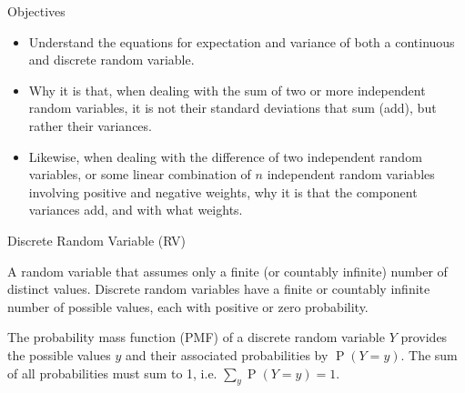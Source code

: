 \documentclass[10pt,handout]{beamer}\usepackage[]{graphicx}\usepackage[]{color}
\newcommand{\Prob}{\operatorname{P}}
\begin{document}
\begin{frame}{Objectives}

	\begin{itemize}
			  \setlength{\itemsep}{10pt}		
		\item Understand the equations for expectation and variance of both a continuous and discrete random variable.
		
		\item Why it is that, when dealing with the sum  of two or more independent random variables, it is not their standard deviations that sum (add), but rather their variances.
		
		\item Likewise, when dealing with the difference  of two independent random variables, or some linear combination of $n$ independent random variables involving positive and negative weights, why it is that the component variances add, and with what weights. 
	\end{itemize}
	
\end{frame}


\begin{frame}{Discrete Random Variable (RV)}
	
\begin{definition}
A random variable that assumes only a finite (or countably infinite) number of distinct values. Discrete random variables have a finite or countably infinite number of possible values, each with positive or zero probability.
\end{definition}

\pause

\begin{definition}
The probability mass function (PMF) of a discrete random variable $Y$ provides the possible values $y$ and their associated probabilities by $\Prob(Y=y)$. The sum of all probabilities must sum to 1, i.e. $\sum_{y} \Prob(Y=y) = 1$. 
\end{definition}
	

\end{frame}
\end{document}
